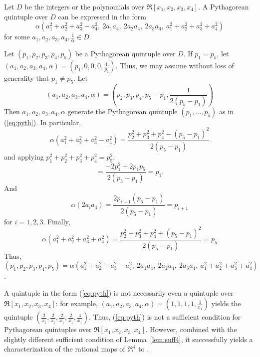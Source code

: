 \begin{theorem}
\label{thm:necessary4}
Let $D$ be the integers or the polynomials over $\Re[x_1,x_2,x_3,x_4]$.
A Pythagorean quintuple over $D$ can be expressed in the form
\begin{equation}
\label{eq:pyth}
	\alpha (a_1^2 + a_2^2 + a_3^2 - a_4^2,
		\ 2a_1a_4,\ 2a_2a_4,\ 2a_3a_4,
		\ a_1^2 + a_2^2 + a_3^2 + a_4^2)
\end{equation}
for some $a_1,a_2,a_3,a_4,\frac{1}{\alpha} \in D$.
\end{theorem}
\prf
Let $(p_1,p_2,p_3,p_4,p_5)$ be a Pythagorean quintuple over $D$.
If $p_1 = p_5$, let $(a_1,a_2,a_3,a_4,\alpha) = (p_1,0,0,0,\frac{1}{p_1})$.
Thus, we may assume without loss of generality that $p_1 \neq p_5$.
Let
\[
(a_1,a_2,a_3,a_4,\alpha) = (p_2,p_3,p_4,p_5-p_1,\frac{1}{2(p_5 - p_1)})
\]
Then $a_1,a_2,a_3,a_4,\alpha$ generate the Pythagorean quintuple
$(p_1,\ldots,p_5)$ as in (\ref{eq:pyth}).
In particular,
\[
\alpha (a_1^2 + a_2^2 + a_3^2 - a_4^2)
= \frac{p_2^2 + p_3^2 + p_4^2 - (p_5 - p_1)^2}{2(p_5-p_1)}
\]
and applying $p_1^2 + p_2^2 + p_3^2 + p_4^2 = p_5^2$,
\[
= \frac{-2p_1^2 + 2p_1p_5}{2(p_5 - p_1)} = p_1.
\]
And
\[
\alpha (2a_i a_4) = \frac{2p_{i+1}(p_5 - p_1)}{2(p_5 - p_1)} = p_{i+1}
\]
for $i=1,2,3$.
Finally, 
\[
\alpha(a_1^2 + a_2^2 + a_3^2 + a_4^2) 
= \frac{p_2^2 + p_3^2 + p_4^2 + (p_5 - p_1)^2}{2(p_5-p_1)} = p_5
\]
Thus, $(p_1,p_2,p_3,p_4,p_5) = \alpha (a_1^2 + a_2^2 + a_3^2 - a_4^2,
		\ 2a_1a_4,\ 2a_2a_4,\ 2a_3a_4,
		\ a_1^2 + a_2^2 + a_3^2 + a_4^2)$.
\QED

A quintuple in the form (\ref{eq:pyth}) is not necessarily
even a quintuple over $\Re[x_1,x_2,x_3,x_4]$: for example, 
$(a_1,a_2,a_3,a_4,\alpha) = (1,1,1,1,\frac{1}{x_1})$ yields the
quintuple $(\frac{2}{x_1}, \frac{2}{x_1}, \frac{2}{x_1}, \frac{2}{x_1}, 
\frac{4}{x_1})$.
Thus, (\ref{eq:pyth}) is not a sufficient condition for Pythagorean quintuples
over $\Re[x_1,x_2,x_3,x_4]$.
However, combined with the slightly different sufficient condition of
Lemma~\ref{lem:suff4}, it successfully yields a characterization
of the rational maps of $\Re^4$ to .

